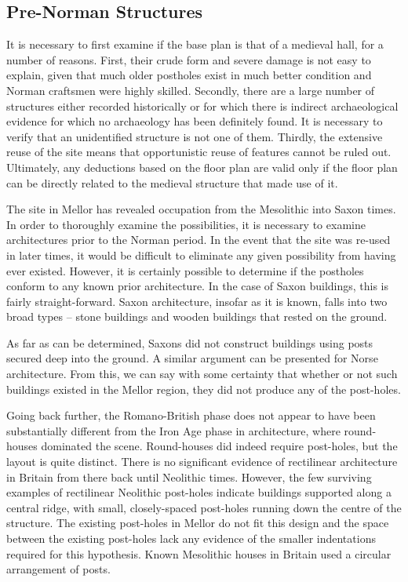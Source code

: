 \documentclass[letterpaper,11pt,titlepage]{article}
\begin{document}
{\subsection{Pre-Norman Structures}
It is necessary to first examine if the base plan is that of a medieval hall, for a number of reasons. First, their crude form and severe damage is not easy to explain, given that much older postholes exist in much better condition and Norman craftsmen were highly skilled. Secondly, there are a large number of structures either recorded historically or for which there is indirect archaeological evidence for which no archaeology has been definitely found. It is necessary to verify that an unidentified structure is not one of them. Thirdly, the extensive reuse of the site means that opportunistic reuse of features cannot be ruled out. Ultimately, any deductions based on the floor plan are valid only if the floor plan can be directly related to the medieval structure that made use of it.

The site in Mellor has revealed occupation from the Mesolithic into Saxon times. In order to thoroughly examine the possibilities, it is necessary to examine architectures prior to the Norman period. In the event that the site was re-used in later times, it would be difficult to eliminate any given possibility from having ever existed. However, it is certainly possible to determine if the postholes conform to any known prior architecture. In the case of Saxon buildings, this is fairly straight-forward. Saxon architecture, insofar as it is known, falls into two broad types -- stone buildings and wooden buildings that rested on the ground.

As far as can be determined, Saxons did not construct buildings using posts secured deep into the ground. A similar argument can be presented for Norse architecture. From this, we can say with some certainty that whether or not such buildings existed in the Mellor region, they did not produce any of the post-holes.

Going back further, the Romano-British phase does not appear to have been substantially different from the Iron Age phase in architecture, where round-houses dominated the scene. Round-houses did indeed require post-holes, but the layout is quite distinct. There is no significant evidence of rectilinear architecture in Britain from there back until Neolithic times. However, the few surviving examples of rectilinear Neolithic post-holes indicate buildings supported along a central ridge, with small, closely-spaced post-holes running down the centre of the structure. The existing post-holes in Mellor do not fit this design and the space between the existing post-holes lack any evidence of the smaller indentations required for this hypothesis. Known Mesolithic houses in Britain used a circular arrangement of posts.

}
\end{document}
